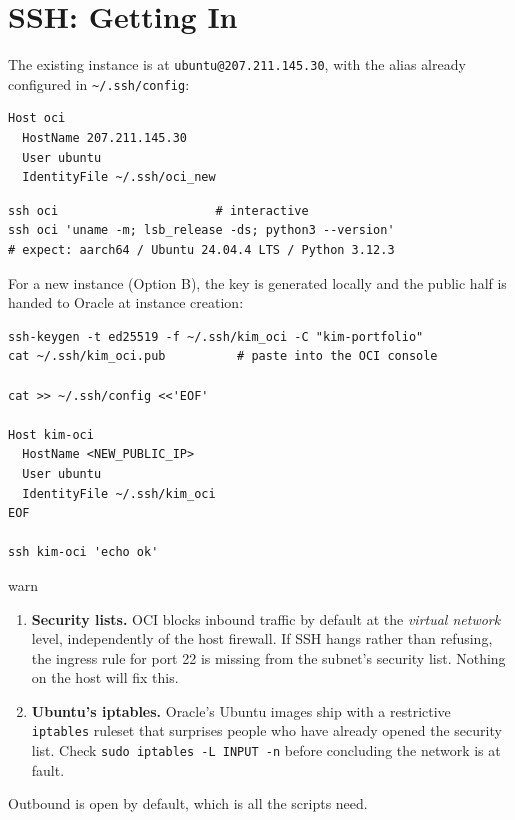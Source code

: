 \documentclass[11pt,a4paper]{article}
\begin{document}
\section{SSH: Getting In}

The existing instance is at \texttt{ubuntu@207.211.145.30}, with the
alias already configured in \texttt{\textasciitilde/.ssh/config}:

\begin{codebox}
\begin{lstlisting}[style=shell]
Host oci
  HostName 207.211.145.30
  User ubuntu
  IdentityFile ~/.ssh/oci_new
\end{lstlisting}
\end{codebox}

\begin{codebox}
\begin{lstlisting}[style=shell]
ssh oci                      # interactive
ssh oci 'uname -m; lsb_release -ds; python3 --version'
# expect: aarch64 / Ubuntu 24.04.4 LTS / Python 3.12.3
\end{lstlisting}
\end{codebox}

For a new instance (Option B), the key is generated locally and the
public half is handed to Oracle at instance creation:

\begin{codebox}
\begin{lstlisting}[style=shell]
ssh-keygen -t ed25519 -f ~/.ssh/kim_oci -C "kim-portfolio"
cat ~/.ssh/kim_oci.pub          # paste into the OCI console

cat >> ~/.ssh/config <<'EOF'

Host kim-oci
  HostName <NEW_PUBLIC_IP>
  User ubuntu
  IdentityFile ~/.ssh/kim_oci
EOF

ssh kim-oci 'echo ok'
\end{lstlisting}
\end{codebox}

\begin{resultbox}{warn}
\begin{enumerate}[leftmargin=1.5em, topsep=2pt]
    \item \textbf{Security lists.} OCI blocks inbound traffic by
          default at the \emph{virtual network} level, independently of
          the host firewall. If SSH hangs rather than refusing, the
          ingress rule for port 22 is missing from the subnet's
          security list. Nothing on the host will fix this.
    \item \textbf{Ubuntu's iptables.} Oracle's Ubuntu images ship with
          a restrictive \texttt{iptables} ruleset that surprises people
          who have already opened the security list. Check
          \texttt{sudo iptables -L INPUT -n} before concluding the
          network is at fault.
\end{enumerate}
Outbound is open by default, which is all the scripts need.
\end{resultbox}
\end{document}
